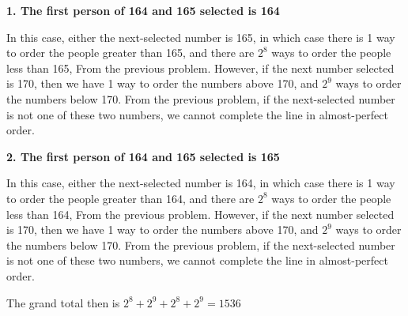 \documentclass[11pt]{article}
\begin{document}
\begin{solution}{3}
\textbf{1. The first person of 164 and 165 selected is 164}

In this case, either the next-selected number is 165, in which case there is 1 way to order the people greater
than 165, and there are  $2^{8}$ ways to order the people less than 165, From the previous problem. However, if the next number selected is 170, then 
we have 1 way to order the numbers above 170, and $2^{9}$ ways to order the numbers below 170. From the previous problem, if the next-selected number
is not one of these two numbers, we cannot complete the line in almost-perfect order.

\textbf{2. The first person of 164 and 165 selected is 165} 

In this case, either the next-selected number is 164, in which case there is 1 way to order the people greater
than 164, and there are  $2^{8}$ ways to order the people less than 164, From the previous problem. However, if the next number selected is 170, then 
we have 1 way to order the numbers above 170, and $2^{9}$ ways to order the numbers below 170. From the previous problem, if the next-selected number
is not one of these two numbers, we cannot complete the line in almost-perfect order.

The grand total then is $2^{8} + 2^{9} + 2^{8} + 2^{9} = 1536$  %
\end{solution}
\begin{solution}{4}
\end{solution}

\begin{solution}{5}
\end{solution}

\end{document}
